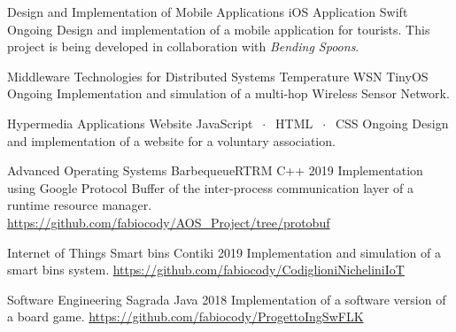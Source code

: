 

\begin{cventries}

\cventry
    {Design and Implementation of Mobile Applications}
    {iOS Application}
    {Swift}
    {Ongoing}
    {Design and implementation of a mobile application for tourists. This project is being developed in collaboration with \textit{Bending Spoons}.}
    
\cventry
    {Middleware Technologies for Distributed Systems}
    {Temperature WSN}
    {TinyOS}
    {Ongoing}
    {Implementation and simulation of a multi-hop Wireless Sensor Network.}
    
\cventry
    {Hypermedia Applications}
    {Website}
    {JavaScript $\;\cdot\;$ HTML $\;\cdot\;$ CSS}
    {Ongoing}
    {Design and implementation of a website for a voluntary association.}

\iffalse
\cventry
    {Recommender System}
    {Kaggle competition}
    {Python}
    {}
    {Design and implementation of a system able to recommend relevant items to users of an e-commerce website. \href{https://github.com/Alenichel/CodiglioniNichelini\_recsys-polimi-2019}{https://github.com/Alenichel/CodiglioniNichelini\_recsys-polimi-2019}}
\fi
    
\cventry
    {Advanced Operating Systems}
    {BarbequeueRTRM}
    {C++}
    {2019}
    {Implementation using Google Protocol Buffer of the inter-process communication layer of a runtime resource manager. \href{https://github.com/fabiocody/AOS\_Project/tree/protobuf}{https://github.com/fabiocody/AOS\_Project/tree/protobuf}}
    
\cventry
    {Internet of Things}
    {Smart bins}
    {Contiki}
    {2019}
    {Implementation and simulation of a smart bins system. \qquad\qquad\qquad\qquad\qquad\qquad\qquad\qquad \href{https://github.com/fabiocody/CodiglioniNicheliniIoT}{https://github.com/fabiocody/CodiglioniNicheliniIoT}}
    
\cventry
    {Software Engineering}
    {Sagrada}
    {Java}
    {2018}
    {Implementation of a software version of a board game. \qquad\qquad\qquad\qquad\qquad\qquad\qquad\qquad\qquad\qquad\qquad\qquad\qquad \href{https://github.com/fabiocody/ProgettoIngSwFLK}{https://github.com/fabiocody/ProgettoIngSwFLK}}
\end{cventries}
